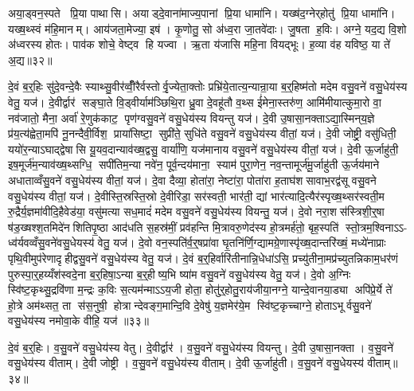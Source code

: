 अया॒ड्वन॒स्पते प्रि॒या पाथासि। अयाड्दे॒वाना॑माज्य॒पानां प्रि॒या धामा॑नि। यख्ष॑द॒ग्नेर्‌होतु॑ प्रि॒या धामा॑नि। यख्ष॒थ्स्वं म॑हि॒मानम्। आय॑जता॒मेज्या॒ इष॑। कृ॒णोतु॒ सो अ॑ध्व॒रा जा॒तवे॑दाः। जु॒षता ह॒विः। अग्ने॒ यद॒द्य वि॒शो अ॑ध्वरस्य होतः। पाव॑क शोचे॒ वेष्ट्व हि यज्वा। ऋ॒ता य॑जासि महि॒ना वियद्भूः। ह॒व्या व॑ह यविष्ठ॒ या ते॑ अ॒द्य॥३२॥\anuvakamend[धामा॑नि॒ भूरेक॑ञ्च]

दे॒वं ब॒र्॒हिः सु॑दे॒वन्दे॒वैः स्याथ्सु॒वीर॑व्वीँ॒रैर्वस्तोर्वृ॒ज्येता॒क्तोः प्रभ्रि॑ये॒तात्य॒न्यान्रा॒या ब॒र्॒हिष्म॑तो मदेम वसु॒वने॑ वसु॒धेय॑स्य वेतु॒ यज॑। दे॒वीर्द्वार॑ सङ्घा॒ते वि॒ड्वीर्याम॑ञ्छिथि॒रा ध्रु॒वा दे॒वहू॑तौ व॒थ्स ई॑मेना॒स्तरु॑ण॒ आमि॑मीयात्कुमा॒रो वा॒ नव॑जातो॒ मैना॒ अर्वा॑ रे॒णुक॑काट॒ पृण॑ग्वसु॒वने॑ वसु॒धेय॑स्य वियन्तु यज॑। दे॒वी उ॒षासा॒नक्ताऽद्या॒स्मिन्‌य॒ज्ञे प्र॑य॒त्य॑ह्वेता॒मपि॑ नू॒नन्दैवी॒र्विश॒ प्राया॑सिष्टा॒ सुप्री॑ते॒ सुधि॑ते वसु॒वने॑ वसु॒धेय॑स्य वीतां॒ यज॑। दे॒वी जोष्ट्री॒ वसु॑धिती॒ ययो॑र॒न्याऽघाद्द्वेषासि यू॒यव॒दान्याव॑ख्ष॒द्वसु॒ वार्या॑णि॒ यज॑मानाय वसु॒वने॑ वसु॒धेय॑स्य वीतां॒ यज॑। दे॒वी ऊ॒र्जाहु॑ती॒ इष॒मूर्ज॑म॒न्याव॑ख्ष॒थ्सग्धि॒ सपी॑तिम॒न्या नवे॑न॒ पूर्व॒न्दय॑माना॒ स्याम॑ पुरा॒णेन॒ नव॒न्तामूर्ज॑मू॒र्जाहु॑ती ऊ॒र्जय॑माने अधाताव्वँसु॒वने॑ वसु॒धेय॑स्य वीतां॒ यज॑। दे॒वा दैव्या॒ होता॑रा॒ नेष्टा॑रा॒ पोता॑रा ह॒ताघ॑शसावाभ॒रद्व॑सू वसु॒वने वसु॒धेय॑स्य वीतां॒ यज॑। दे॒वीस्ति॒स्रस्ति॒स्रो दे॒वीरिडा॒ सर॑स्वती॒ भार॑ती॒ द्यां भार॑त्यादि॒त्यैर॑स्पृख्ष॒थ्सर॑स्वती॒म रु॒द्रैर्य॒ज्ञमा॑वीदि॒हैवेड॑या॒ वसु॑मत्या सध॒मादं॑ मदेम वसु॒वने॑ वसु॒धेय॑स्य वियन्तु॒ यज॑। दे॒वो नरा॒शस॑स्त्रिशी॒र्॒षा ष॑ड॒ख्षश्श॒तमिदे॑नशितिपृ॒ष्ठा आद॑धति स॒हस्र॑मीं॒ प्रव॑हन्ति मि॒त्रावरु॒णेद॑स्य हो॒त्रमर्\mbox{}ह॑तो॒ बृह॒स्पति॑ स्तो॒त्रम॒श्विनाऽऽ- ध्व॑र्यवव्वँसु॒वने॑वसु॒धेयस्य॑ वेतु॒ यज॑। दे॒वो वन॒स्पति॑र्व॒र्॒षप्रा॑वा घृ॒तनि॑र्णि॒ग्द्यामग्रे॒णास्पृ॑ख्ष॒दान्तरि॑ख्षं॒ मध्ये॑नाप्राः पृथि॒वीमुप॑रेणादृहीद्वसु॒वने॑ वसु॒धेय॑स्य वेतु॒ यज॑। दे॒वं ब॒र्॒हिर्वारि॑तीनान्नि॒धेधा॑ऽसि॒ प्रच्यु॑तीना॒मप्र॑च्युतन्निकाम॒धर॑णं पुरुस्पा॒र्॒हय्यँश॑स्वदे॒ना ब॒र्॒हिषा॒ऽन्या ब॒र्॒हीष्य॒भि ष्या॑म वसु॒वने॑ वसु॒धेय॑स्य वेतु॒ यज॑। दे॒वो अ॒ग्निः स्वि॑ष्ट॒कृथ्सु॒द्रवि॑णा म॒न्द्रः क॒विः स॒त्यम॑न्माऽऽय॒जी होता॒ होतु॑र्॒होतु॒राय॑जीया॒नग्ने॒ यान्दे॒वानया॒ड्या अपि॑प्रे॒र्ये ते॑ हो॒त्रे अम॑थ्सत॒ ता स॑स॒नुषी॒ होत्रान्देवङ्ग॒मान्दि॒वि दे॒वेषु॑ य॒ज्ञमेर॑ये॒म स्वि॑ष्ट॒कृच्चाग्ने॒ होताऽभूर्वसु॒वने॑ वसु॒धेय॑स्य नमोवा॒के वीहि॒ यज॑ ॥३३॥\anuvakamend[यजैक॑ञ्च]

दे॒वं ब॒र्॒हिः। व॒सु॒वने॑ वसु॒धेय॑स्य वेतु। दे॒वीर्द्वार॑। व॒सु॒वने॑ वसु॒धेय॑स्य वियन्तु। दे॒वी उ॒षासा॒नक्ता। व॒सु॒वने॑ वसु॒धेय॑स्य वीताम्। दे॒वी जोष्ट्री। व॒सु॒वने॑ वसु॒धेय॑स्य वीताम्। दे॒वी ऊ॒र्जाहु॑ती। व॒सु॒वने॑ वसु॒धेयस्य॑ वीताम्॥३४॥

